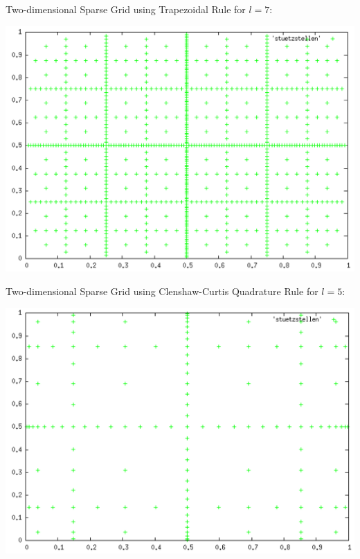 \documentclass[10pt,a4paper]{article}
\begin{document}
Two-dimensional Sparse Grid using Trapezoidal Rule for $l=7$:
\begin{center}
\includegraphics[scale=0.5]{sparse_grid_l7.png}	
\end{center}

Two-dimensional Sparse Grid using Clenshaw-Curtis Quadrature Rule for $l=5$:
\begin{center}
\includegraphics[scale=0.5]{clenshaw_curtis_l5.png}	
\end{center}
\end{document}
